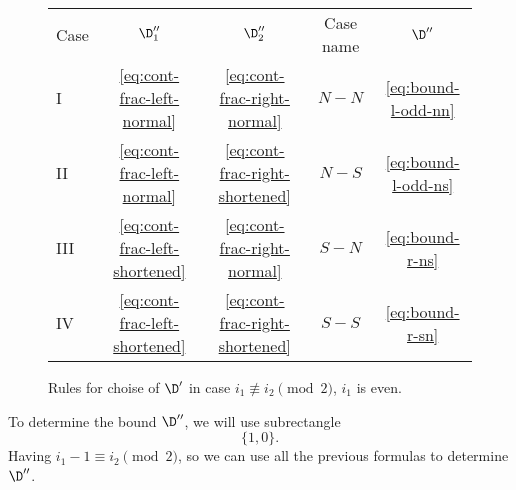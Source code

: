 \begin{figure}[ht]
	\centering
	\begin{tabular}{| l | c c c | c |}
		\cline{1-5}
		Case & $\D_1''$ & $\D_2''$ & Case name & $\D''$ \\
		\cline{1-5}
			I &
			\ref{eq:cont-frac-left-normal} &
			\ref{eq:cont-frac-right-normal} &
			$N-N$ &
			\ref{eq:bound-l-odd-nn}
		\\
			II &
			\ref{eq:cont-frac-left-normal} &
			\ref{eq:cont-frac-right-shortened} &
			$N-S$ &
			\ref{eq:bound-l-odd-ns}
		\\
			III &
			\ref{eq:cont-frac-left-shortened} &
			\ref{eq:cont-frac-right-normal} &
			$S-N$ &
			\ref{eq:bound-r-ns}
		\\
			IV &
			\ref{eq:cont-frac-left-shortened} &
			\ref{eq:cont-frac-right-shortened} &
			$S-S$ &
			\ref{eq:bound-r-sn}
		\\
		\cline{1-5}
	\end{tabular}
	\caption{Rules for choise of $\D'$ in case $i_1 \not\equiv i_2 \pmod 2$, $i_1$ is even.}
	\label{fg:rectangle-l-odd-bound-choise}
\end{figure}

To determine the bound $\D''$, we will use subrectangle
\begin{equation*}
	\{1, 0\}.
\end{equation*}
Having $i_1 - 1 \equiv i_2 \pmod 2$, so we can use all the previous formulas to determine $\D''$.

